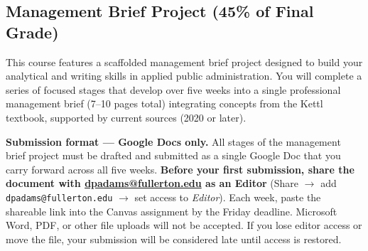 \documentclass[12pt]{article}
\begin{document}
\subsection*{Management Brief Project (45\% of Final Grade)}
This course features a scaffolded management brief project designed to build your analytical and writing skills in applied public administration. You will complete a series of focused stages that develop over five weeks into a single professional management brief (7--10 pages total) integrating concepts from the Kettl textbook, supported by current sources (2020 or later).

\vspace{0.5em}
\noindent \textbf{Submission format --- Google Docs only.} All stages of the management brief project must be drafted and submitted as a single Google Doc that you carry forward across all five weeks. \textbf{Before your first submission, share the document with \href{mailto:dpadams@fullerton.edu}{dpadams@fullerton.edu} as an Editor} (Share $\rightarrow$ add \texttt{dpadams@fullerton.edu} $\rightarrow$ set access to \emph{Editor}). Each week, paste the shareable link into the Canvas assignment by the Friday deadline. Microsoft Word, PDF, or other file uploads will not be accepted. If you lose editor access or move the file, your submission will be considered late until access is restored.
\end{document}
